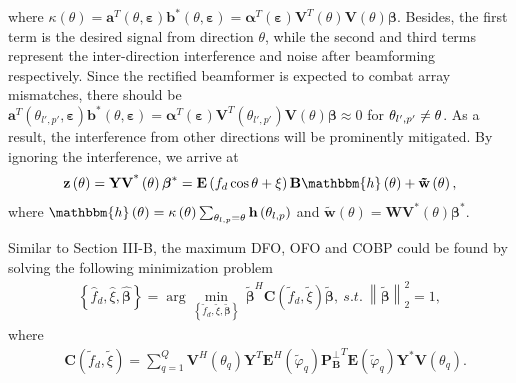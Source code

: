 \documentclass[12pt, draftclsnofoot, onecolumn]{IEEEtran}
\begin{document}
where $\kappa\left( \theta  \right) = {{\mathbf{a}}^{T}}\left( {{\theta }}, \boldsymbol{\varepsilon } \right) {{\mathbf{b}}^{\text{*}}}\left( \theta , {\boldsymbol{\varepsilon}}  \right) = {{\boldsymbol{\alpha}}^{T}}\left( \boldsymbol{\varepsilon } \right) {{\mathbf{V}}^{T}}\left( {{\theta }} \right) \mathbf{V}\left( \theta  \right)\boldsymbol{\beta }$. Besides, the first term is the desired signal from direction $\theta$, while the second and third terms represent the inter-direction interference and noise after beamforming respectively. Since the rectified beamformer is expected to combat array mismatches, there should be ${{\mathbf{a}}^{T}}\left( {{\theta }_{l', p'}}, \boldsymbol{\varepsilon } \right){{\mathbf{b}}^{\text{*}}}\left( \theta , {\boldsymbol{\varepsilon}}  \right) \!=\! {{\boldsymbol{\alpha}}^{T}}\left( \boldsymbol{\varepsilon } \right) {{\mathbf{V}}^{T}}\left( {{\theta }_{l', p'}} \right) \mathbf{V}\left( \theta  \right) \boldsymbol{\beta } \approx\! 0$ for ${{\theta }_{l', p'}} \\ \ne \theta$. As a result, the interference from other directions will be prominently mitigated. By ignoring the interference, we arrive at
\begin{align}
\mathbf{z}\left( \theta  \right)=\mathbf{Y}{{\mathbf{V}}^{\text{*}}}\left( \theta  \right){{\boldsymbol{\beta }}^{*}}=\mathbf{E}\left( {{f}_{d}}\cos \theta +\xi  \right)\mathbf{B}\mathbbm{h}\left( \theta  \right)+\mathbf{\tilde{w}}\left( \theta \right),
\end{align}
where $\mathbbm{h}\left( \theta  \right)=\kappa\left( \theta  \right) \sum\nolimits_{{{\theta }_{l,p}}=\theta }{\mathbf{h}\left( {{\theta }_{l,p}} \right)}$
and $\mathbf{\tilde{w}}\left( \theta \right) =\mathbf{W}{{\mathbf{V}}^{\text{*}}} \left( \theta \right) {{\boldsymbol{\beta }}^{*}}$.

Similar to Section III-B, the maximum DFO, OFO and COBP could be found by solving the following minimization problem
\begin{align} \label{OptimBeta}
\left\{{\hat{f}}_{d}, \hat{\xi }, \boldsymbol{\hat{\beta }}\right\} = \arg \underset{\left\{{{\tilde{f}}}_{d}, \tilde{\xi }, \boldsymbol{\tilde{\beta }}\right\}}{\mathop{\min }}\,{{{\boldsymbol{\tilde{\beta }}}}^{H}}{\mathbf{C}\left( {{{\tilde{f}}}_{d}}, \tilde{\xi } \right)}\boldsymbol{\tilde{\beta }},\ s.t.\ \left\| {\boldsymbol{\tilde{\beta }}} \right\|_{2}^{2}=1,
\end{align}
where
\begin{align}
& \mathbf{C}\left( {{{\tilde{f}}}_{d}}, \tilde{\xi } \right) = \sum\limits_{q=1}^{Q}{{\mathbf{V}}^{H}}\left( {{\theta }_{q}} \right){{\mathbf{Y}}^{T}}{{\mathbf{E}}^{H}}\left( \tilde{\varphi}_{q} \right) {{\mathbf{P}_{\mathbf{B}}^{\bot } }^{T}}\mathbf{E}\left( \tilde{\varphi}_{q} \right){{\mathbf{Y}}^{*}}\mathbf{V}\left( {{\theta }_{q}} \right).
\end{align}
\end{document}
